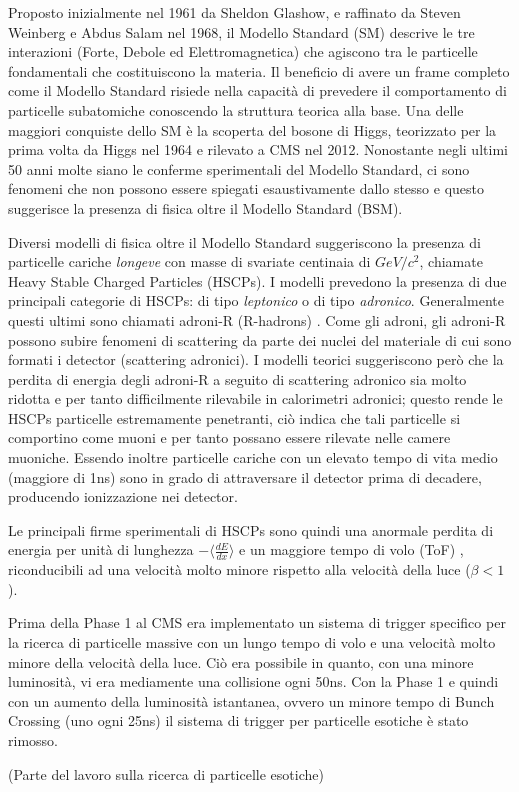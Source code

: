 Proposto inizialmente nel 1961 da Sheldon Glashow, e raffinato da Steven Weinberg e Abdus Salam nel 1968, il Modello Standard (SM) descrive le tre interazioni (Forte, Debole ed Elettromagnetica) che agiscono tra le particelle fondamentali che costituiscono la materia. Il beneficio di avere un frame completo come il Modello Standard risiede nella capacità di prevedere il comportamento di particelle subatomiche conoscendo la struttura teorica alla base. Una delle maggiori conquiste dello SM è la scoperta del bosone di Higgs, teorizzato per la prima volta da Higgs nel 1964 e rilevato a CMS nel 2012. \newline
Nonostante negli ultimi 50 anni molte siano le conferme sperimentali del Modello Standard, ci sono fenomeni che non possono essere spiegati esaustivamente dallo stesso e questo suggerisce la presenza di fisica oltre il Modello Standard (BSM).

Diversi modelli di fisica oltre il Modello Standard suggeriscono la presenza di particelle cariche \textit{longeve} con masse di svariate centinaia di $GeV/c^2$, chiamate Heavy Stable Charged Particles (HSCPs). I modelli prevedono la presenza di due principali categorie di HSCPs: di tipo \textit{leptonico} o di tipo \textit{adronico}. Generalmente questi ultimi sono chiamati adroni-R (R-hadrons) \cite{Quertenmont:2010ota}. \newline
Come gli adroni, gli adroni-R possono subire fenomeni di scattering da parte dei nuclei del materiale di cui sono formati i detector (scattering adronici). I modelli teorici suggeriscono però che la perdita di energia degli adroni-R a seguito di scattering adronico sia molto ridotta e per tanto difficilmente rilevabile in calorimetri adronici; questo rende le HSCPs particelle estremamente penetranti, ciò indica che tali particelle si comportino come muoni e per tanto possano essere rilevate nelle camere muoniche. \newline
Essendo inoltre particelle cariche con un elevato tempo di vita medio (maggiore di 1ns) sono in grado di attraversare il detector prima di decadere, producendo ionizzazione nei detector.

Le principali firme sperimentali di HSCPs sono quindi una anormale perdita di energia per unità di lunghezza $- \langle \frac{dE}{dx}\rangle$ e un maggiore tempo di volo (ToF) \cite{MasterThesisGioMoc}, riconducibili ad una velocità molto minore rispetto alla velocità della luce ($\beta < 1$). 

Prima della Phase 1 al CMS era implementato un sistema di trigger specifico per la ricerca di particelle massive con un lungo tempo di volo e una velocità molto minore della velocità della luce. Ciò era possibile in quanto, con una minore luminosità, vi era mediamente una collisione ogni 50ns. Con la Phase 1 e quindi con un aumento della luminosità istantanea, ovvero un minore tempo di Bunch Crossing (uno ogni 25ns) il sistema di trigger per particelle esotiche è stato rimosso. 

(Parte del lavoro sulla ricerca di particelle esotiche)